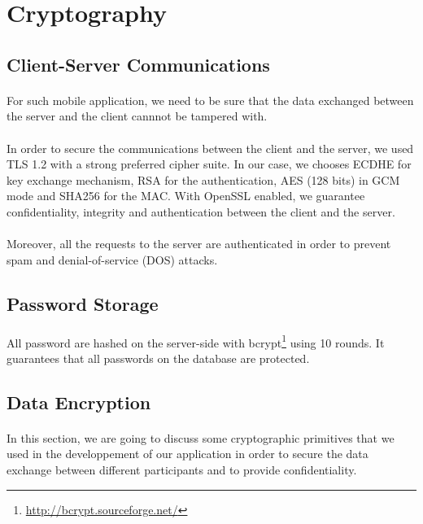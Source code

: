 \section{Cryptography}
  \subsection{Client-Server Communications}
	\paragraph{}
		For such mobile application, we need to be sure that the data exchanged between the server and the client cannnot be tampered with.
	\paragraph{}
		In order to secure the communications between the client and the server, we used TLS 1.2 with a strong preferred cipher suite. In our case, we chooses ECDHE for key exchange mechanism, RSA for the authentication, AES (128 bits) in GCM mode and SHA256 for the MAC.
		With OpenSSL enabled, we guarantee confidentiality, integrity  and authentication between the client and the server.
	\paragraph{}
		Moreover, all the requests to the server are authenticated in order to prevent spam and denial-of-service (DOS) attacks.
  \subsection{Password Storage}
  	\paragraph{}
		All password are hashed on the server-side with bcrypt\footnote{\url{http://bcrypt.sourceforge.net/}} using 10 rounds. It guarantees that all passwords on the database are protected.
  \subsection{Data Encryption}
    \paragraph{}
      In this section, we are going to discuss some cryptographic primitives that we used in the developpement of our application in order to secure the data exchange between different participants and to provide confidentiality.
      
